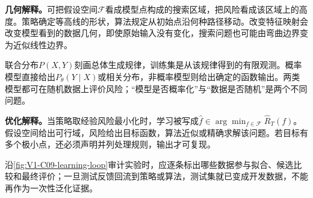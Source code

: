 \begin{geometrybox}\label{schema:V1-C09:CH-14}
\textbf{几何解释。}可把假设空间$\mathcal F$看成模型点构成的搜索区域，把风险看成该区域上的高度。策略确定等高线的形状，算法规定从初始点沿何种路径移动。改变特征映射会改变模型看到的数据几何，即使原始输入没有变化，搜索问题也可能由弯曲边界变为近似线性边界。
\end{geometrybox}
\begin{probabilitybox}\label{schema:V1-C09:CH-15}
联合分布$P(X,Y)$刻画总体生成规律，训练集是从该规律得到的有限观测。概率模型直接给出$P_\theta(Y\mid X)$或相关分布，非概率模型则给出确定的函数输出。两类模型都可在随机数据上评价风险；“模型是否概率化”与“数据是否随机”是两个不同问题。
\end{probabilitybox}
\begin{optimizationbox}\label{schema:V1-C09:CH-16}
\textbf{优化解释。}当策略取经验风险最小化时，学习被写成$\widehat f\in\arg\min_{f\in\mathcal F}\widehat R_T(f)$。假设空间给出可行域，风险给出目标函数，算法近似或精确求解该问题。若目标有多个极小点，还必须声明并列处理规则，输出才可复现。
\end{optimizationbox}


沿\cref{fig:V1-C09-learning-loop}审计实验时，应逐条标出哪些数据参与拟合、候选比较和最终评价；一旦测试反馈回流到策略或算法，测试集就已变成开发数据，不能再作为一次性泛化证据。

